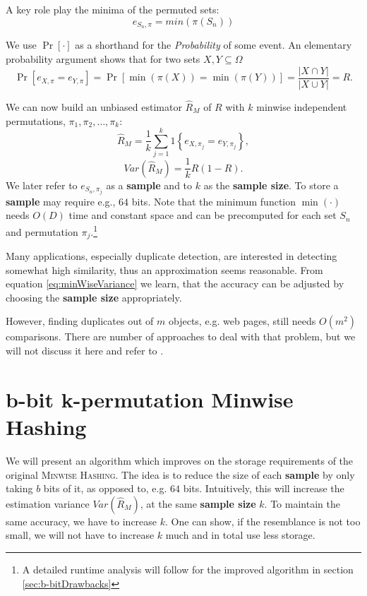 \documentclass[a4paper]{article}
\begin{document}
A key role play the minima of the permuted sets:
\[
e_{S_n,\pi}=min(\pi(S_n))
\]

We use $\Pr[\cdot]$ as a shorthand for the \emph{Probability} of some event. An elementary probability argument shows that for two sets $X,Y \subseteq \Omega$
\begin{equation}\label{eq:minwiseOri}
\Pr[e_{X,\pi}=e_{Y,\pi}]=\Pr [\min(\pi(X))=\min(\pi(Y))]=\frac{\left| X \cap Y \right|}{\left| X \cup Y \right|}=R.
\end{equation}

We can now build an unbiased estimator $\hat{R}_M$ of $R$ with $k$ minwise independent permutations, $\pi_1,\pi_2,\ldots,\pi_k$:
\begin{equation}
\hat{R}_M=\frac{1}{k}\sum_{j=1}^k 1 \left\lbrace e_{X,\pi_j}=e_{Y,\pi_j} \right\rbrace,
\end{equation}
\begin{equation}\label{eq:minWiseVariance}
Var(\hat{R}_M)=\frac{1}{k}R(1-R).
\end{equation}
We later refer to $e_{S_n,\pi_j}$ as a \textbf{sample} and to $k$ as the \textbf{sample size}. To store a \textbf{sample} may require e.g., $64$ bits. Note that the minimum function $\min(\cdot)$ needs $O(D)$ time and constant space and can be precomputed for each set $S_n$ and permutation $\pi_j$.\footnote{A detailed runtime analysis will follow for the improved algorithm in section \vref{sec:b-bitDrawbacks}}

Many applications, especially duplicate detection, are interested in detecting somewhat high similarity, thus an approximation seems reasonable. From equation \vref{eq:minWiseVariance} we learn, that the accuracy can be adjusted by choosing the \textbf{sample size} appropriately.

However, finding duplicates out of $m$ objects, e.g. web pages, still needs $O(m^2)$ comparisons. There are number of approaches to deal with that problem, but we will not discuss it here and refer to \citep{BroderGMZ97,STOC02*380}.


\section{b-bit k-permutation Minwise Hashing}\label{sec:b-bitMinwiseHashing}

We will present an algorithm which improves on the storage requirements of the original \textsc{Minwise Hashing}. The idea is to reduce the size of each \textbf{sample} by only taking $b$ bits of it, as opposed to, e.g. $64$ bits. Intuitively, this will increase the estimation variance $Var(\hat{R}_M)$, at the same \textbf{sample size} $k$. To maintain the same accuracy, we have to increase $k$. One can show, if the resemblance is not too small, we will not have to increase $k$ much and in total use less storage.
\end{document}
